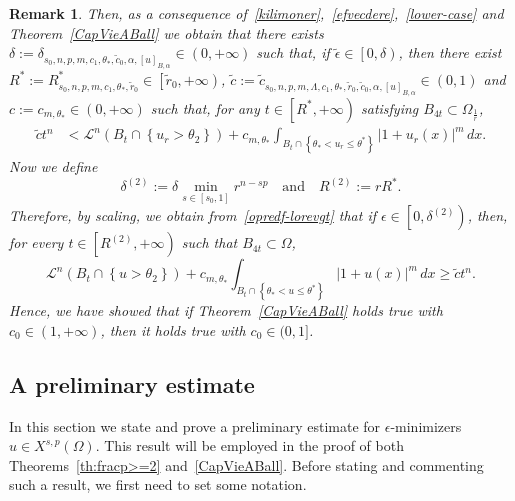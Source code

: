 \documentclass[12pt]{article}
\numberwithin{equation}{section}
\newtheorem{rem}[thm]{Remark}
\renewcommand{\leq}{\leqslant}
\renewcommand{\geq}{\geqslant}
\begin{document}
\begin{rem}
{Then, as a consequence of~\eqref{kilimoner},~\eqref{efvecdere},~\eqref{lower-case} and Theorem~\ref{CapVieABall} we obtain that there exists $\delta:=\delta_{s_0,n,p,m,c_1,\theta_*,\tilde{c}_0,\alpha,[u]_{B,\alpha}}\in (0,+\infty)$ such that, if $\tilde{\epsilon}\in \left[0,\delta\right)$, then
there exist~$R^*:=R_{s_0,n,p,m,c_1,\theta_*,\tilde{r}_0}^*\in \left[\tilde{r}_0,+\infty\right)$, $\tilde{c}:=\tilde{c}_{s_0,n,p,m,\Lambda,c_1,\theta_*,\tilde{r}_0,\tilde{c}_0,\alpha,[u]_{B,\alpha}}\in (0,1)$ and $c:=c_{m,\theta_*}\in (0,+\infty)$ such that, for any $t\in \left[R^*,+\infty\right)$ satisfying $B_{4t}\subset \Omega_{\frac{1}{r}}$,
\begin{equation}\label{opredf-lorevgt}
\begin{split}
\tilde{c}t^n &<\mathcal{L}^n(B_t\cap \left\lbrace u_r>\theta_2 \right\rbrace)+c_{m,\theta_*}\int_{B_t\cap \left\lbrace \theta_{*}< u_r\leq \theta^* \right\rbrace}\left|1+u_r(x)\right|^m\,dx.
\end{split}
\end{equation} 
Now we define 
\begin{equation*}
\delta^{(2)}:=\delta \min_{s\in \left[s_0,1\right]}r^{n-sp}\quad\mbox{and}\quad R^{(2)}:=r R^*. 
\end{equation*}
Therefore, by scaling, we obtain from~\eqref{opredf-lorevgt} that if $\epsilon\in \left[0,\delta^{(2)}\right)$, then, for every $t\in \left[R^{(2)},+\infty\right)$ such that $B_{4t}\subset \Omega$,
\begin{equation*}
\mathcal{L}^n\left( B_{t}\cap \left\lbrace u>\theta_2 \right\rbrace\right)+ c_{m,\theta_*}\int_{B_{t}\cap \left\lbrace \theta_{*}< u \leq \theta^* \right\rbrace}\left|1+u(x)\right|^m\,dx \geq \tilde{c} t^n. 
\end{equation*}
Hence, we have showed that if Theorem~\ref{CapVieABall} holds true with $c_0\in (1,+\infty)$, then it holds true with $c_0\in (0,1]$.
}
\end{rem}









\subsection{A preliminary estimate}\label{gi-i-gio}
In this section we state and prove a preliminary estimate for $\epsilon$-minimizers $u\in X^{s,p}(\Omega)$. This result will be employed in the proof of both Theorems~\ref{th:fracp>=2} and~\ref{CapVieABall}. Before stating and commenting such a result, we first need to set some notation.  
\end{document}
